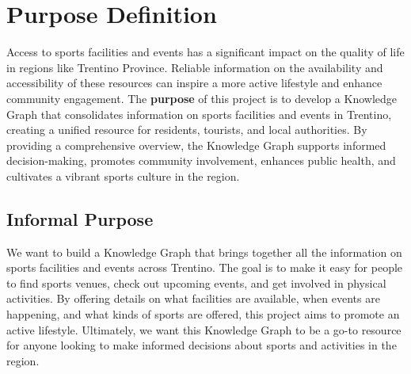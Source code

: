 \section{Purpose Definition}
\noindent Access to sports facilities and events has a significant impact on the quality of life in regions like Trentino Province. Reliable information on the availability and accessibility of these resources can inspire a more active lifestyle and enhance community engagement. The \textbf{purpose} of this project is to develop a Knowledge Graph that consolidates information on sports facilities and events in Trentino, creating a unified resource for residents, tourists, and local authorities. By providing a comprehensive overview, the Knowledge Graph supports informed decision-making, promotes community involvement, enhances public health, and cultivates a vibrant sports culture in the region.

\subsection{Informal Purpose}
We want to build a Knowledge Graph that brings together all the information on sports facilities and events across Trentino. The goal is to make it easy for people to find sports venues, check out upcoming events, and get involved in physical activities. By offering details on what facilities are available, when events are happening, and what kinds of sports are offered, this project aims to promote an active lifestyle. Ultimately, we want this Knowledge Graph to be a go-to resource for anyone looking to make informed decisions about sports and activities in the region.

